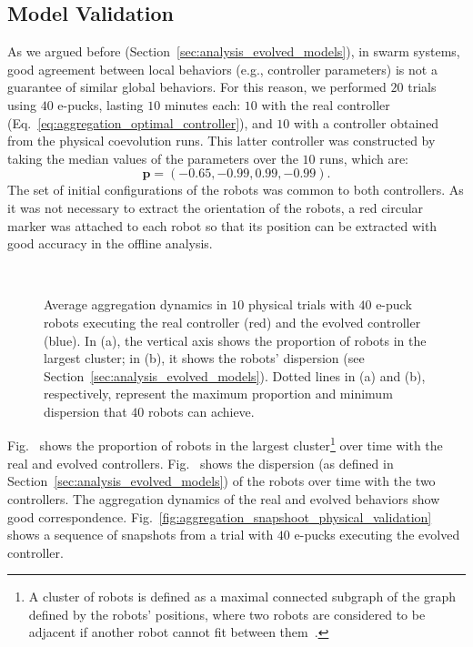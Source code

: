 \subsection{Model Validation}
As we argued before (Section~\ref{sec:analysis_evolved_models}), in swarm systems, good agreement between local behaviors (e.g., controller parameters) is not a guarantee of similar global behaviors. For this reason, we performed $20$ trials using $40$ e-pucks, lasting $10$ minutes each: $10$ with the real controller (Eq.~\eqref{eq:aggregation_optimal_controller}), and $10$ with a controller obtained from the physical coevolution runs. This latter controller was constructed by taking the median values of the parameters over the $10$ runs, which are:
$$
\mathbf{p}=\left(-0.65, -0.99, 0.99, -0.99\right).
$$
The set of initial configurations of the robots was common to both controllers. As it was not necessary to extract the orientation of the robots, a red circular marker was attached to each robot so that its position can be extracted with good accuracy in the offline analysis.
%
\begin{figure}[!t]%
	\centering
		\\
		\caption{Average aggregation dynamics in $10$ physical trials with $40$ e-puck robots executing the real controller (red) and the evolved controller (blue). In (a), the vertical axis shows the proportion of robots in the largest cluster; in (b), it shows the robots' dispersion (see Section~\ref{sec:analysis_evolved_models}). Dotted lines in (a) and (b), respectively, represent the maximum proportion and minimum dispersion that $40$ robots can achieve.}
		\label{fig:aggregation_dynamics_physical}
\end{figure}
%
Fig.~ shows the proportion of robots in the largest cluster\footnote{A cluster of robots is defined as a maximal connected subgraph of the graph defined by the robots' positions, where two robots are considered to be adjacent if another robot cannot fit between them~\cite{Gauci2014_ijrr}.} over time with the real and evolved controllers. Fig.~ shows the dispersion (as defined in Section~\ref{sec:analysis_evolved_models}) of the robots over time with the two controllers. The aggregation dynamics of the real and evolved behaviors show good correspondence. Fig.~\ref{fig:aggregation_snapshoot_physical_validation} shows a sequence of snapshots from a trial with $40$ e-pucks executing the evolved controller.

